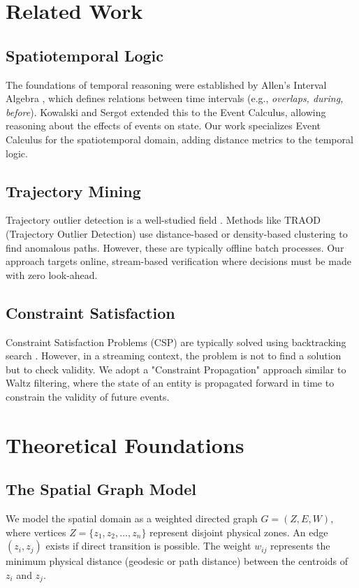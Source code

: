 \documentclass[conference]{IEEEtran}
\begin{document}
\section{Related Work}

\subsection{Spatiotemporal Logic}
The foundations of temporal reasoning were established by Allen's Interval Algebra \cite{b3}, which defines relations between time intervals (e.g., \textit{overlaps, during, before}). Kowalski and Sergot \cite{b2} extended this to the Event Calculus, allowing reasoning about the effects of events on state. Our work specializes Event Calculus for the spatiotemporal domain, adding distance metrics to the temporal logic.

\subsection{Trajectory Mining}
Trajectory outlier detection is a well-studied field \cite{b7}. Methods like TRAOD (Trajectory Outlier Detection) use distance-based or density-based clustering to find anomalous paths. However, these are typically offline batch processes. Our approach targets online, stream-based verification where decisions must be made with zero look-ahead.

\subsection{Constraint Satisfaction}
Constraint Satisfaction Problems (CSP) are typically solved using backtracking search \cite{b4}. However, in a streaming context, the problem is not to find a solution but to check validity. We adopt a "Constraint Propagation" approach similar to Waltz filtering, where the state of an entity is propagated forward in time to constrain the validity of future events.

\section{Theoretical Foundations}

\subsection{The Spatial Graph Model}
We model the spatial domain as a weighted directed graph $G = (Z, E, W)$, where vertices $Z = \{z_1, z_2, \dots, z_n\}$ represent disjoint physical zones. An edge $(z_i, z_j)$ exists if direct transition is possible. The weight $w_{ij}$ represents the minimum physical distance (geodesic or path distance) between the centroids of $z_i$ and $z_j$.
\end{document}
